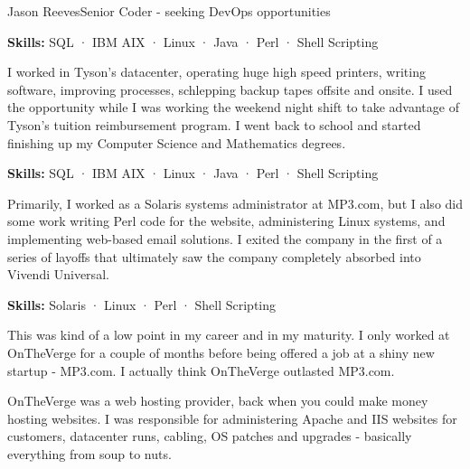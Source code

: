 \documentclass{article}
\begin{document}
\begin{cv}[avatar]{Jason Reeves}{Senior Coder - seeking DevOps opportunities}
\begin{cvevent}[Sep 2004][Sep 2005]
  \textbf{Skills:} SQL · IBM AIX · Linux · Java · Perl · Shell Scripting
  \vspace*{5mm}
\end{cvevent}

\begin{cvevent}[Sep 2001][Sep 2004]
  I worked in Tyson's datacenter, operating huge high speed printers, writing software, improving processes, schlepping backup tapes offsite and onsite. I used the opportunity while I was working the weekend night shift to take advantage of Tyson's tuition reimbursement program. I went back to school and started finishing up my Computer Science and Mathematics degrees.
  \vspace*{3mm}
  
  \textbf{Skills:} SQL · IBM AIX · Linux · Java · Perl · Shell Scripting
  \vspace*{5mm}
\end{cvevent}

\begin{cvevent}[May 2000][Jan 2001]
  Primarily, I worked as a Solaris systems administrator at MP3.com, but I also did some work writing Perl code for the website, administering Linux systems, and implementing web-based email solutions. I exited the company in the first of a series of layoffs that ultimately saw the company completely absorbed into Vivendi Universal.
  \vspace*{3mm}
  
  \textbf{Skills:} Solaris · Linux · Perl · Shell Scripting
  \vspace*{5mm}
\end{cvevent}

\begin{cvevent}[Mar 2000][May 2000]
  This was kind of a low point in my career and in my maturity. I only worked at OnTheVerge for a couple of months before being offered a job at a shiny new startup - MP3.com. I actually think OnTheVerge outlasted MP3.com. 
  \vspace*{3mm}
  
  OnTheVerge was a web hosting provider, back when you could make money hosting websites. I was responsible for administering Apache and IIS websites for customers, datacenter runs, cabling, OS patches and upgrades - basically everything from soup to nuts.
  \vspace*{3mm}
  

\end{cvevent}
\end{cv}
\end{document}
